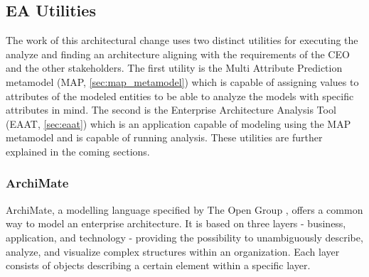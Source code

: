 \subsection{EA Utilities}
\label{sec:ea_utilities}
The work of this architectural change uses two distinct utilities for executing the analyze and finding an architecture aligning with the requirements of the CEO and the other stakeholders. The first utility is the Multi Attribute Prediction metamodel (MAP, \vref{sec:map_metamodel}) which is capable of assigning values to attributes of the modeled entities to be able to analyze the models with specific attributes in mind. The second is the Enterprise Architecture Analysis Tool (EAAT, \vref{sec:eaat}) which is an application capable of modeling using the MAP metamodel and is capable of running analysis. These utilities are further explained in the coming sections.
\subsubsection{ArchiMate}
\label{sec:archimate}
ArchiMate, a modelling language specified by The Open Group \cite{archi}, offers a common way to model an enterprise architecture. It is based on three layers - business, application, and technology - providing the possibility to unambiguously describe, analyze, and visualize complex structures within an organization. Each layer consists of objects describing a certain element within a specific layer.
